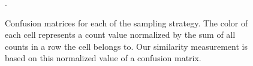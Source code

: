 \begin{figure}
\caption{Confusion matrices for each of the sampling strategy. The color of each cell represents a count value normalized by the sum of all counts in a row the cell belongs to. Our similarity measurement is based on this normalized value of a confusion matrix. } \label{confusion}.
\end{figure}



